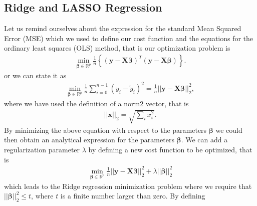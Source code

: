 \documentclass[letterpaper,10pt,english]{sphinxmanual}
\begin{document}
\subsection{Ridge and LASSO Regression}
\label{\detokenize{chapter4:ridge-and-lasso-regression}}
Let us remind ourselves about the expression for the standard Mean Squared Error (MSE) which we used to define our cost function and the equations for the ordinary least squares (OLS) method, that is
our optimization problem is
\begin{equation*}
\begin{split}
{\displaystyle \min_{\boldsymbol{\beta}\in {\mathbb{R}}^{p}}}\frac{1}{n}\left\{\left(\boldsymbol{y}-\boldsymbol{X}\boldsymbol{\beta}\right)^T\left(\boldsymbol{y}-\boldsymbol{X}\boldsymbol{\beta}\right)\right\}.
\end{split}
\end{equation*}
or we can state it as
\begin{equation*}
\begin{split}
{\displaystyle \min_{\boldsymbol{\beta}\in
{\mathbb{R}}^{p}}}\frac{1}{n}\sum_{i=0}^{n-1}\left(y_i-\tilde{y}_i\right)^2=\frac{1}{n}\vert\vert \boldsymbol{y}-\boldsymbol{X}\boldsymbol{\beta}\vert\vert_2^2,
\end{split}
\end{equation*}
where we have used the definition of  a norm\sphinxhyphen{}2 vector, that is
\begin{equation*}
\begin{split}
\vert\vert \boldsymbol{x}\vert\vert_2 = \sqrt{\sum_i x_i^2}.
\end{split}
\end{equation*}
By minimizing the above equation with respect to the parameters
\(\boldsymbol{\beta}\) we could then obtain an analytical expression for the
parameters \(\boldsymbol{\beta}\).  We can add a regularization parameter \(\lambda\) by
defining a new cost function to be optimized, that is
\begin{equation*}
\begin{split}
{\displaystyle \min_{\boldsymbol{\beta}\in
{\mathbb{R}}^{p}}}\frac{1}{n}\vert\vert \boldsymbol{y}-\boldsymbol{X}\boldsymbol{\beta}\vert\vert_2^2+\lambda\vert\vert \boldsymbol{\beta}\vert\vert_2^2
\end{split}
\end{equation*}
which leads to the Ridge regression minimization problem where we
require that \(\vert\vert \boldsymbol{\beta}\vert\vert_2^2\le t\), where \(t\) is
a finite number larger than zero. By defining
\end{document}
